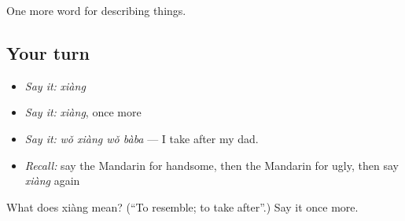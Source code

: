 \begin{grammarlens}[title={What you've built}]
One more word for describing things.
\end{grammarlens}

\subsection*{Your turn}
\begin{itemize}
\raggedright
  \item \emph{Say it:} \emph{xiàng}
  \item \emph{Say it:} \emph{xiàng}, once more
  \item \emph{Say it:} \emph{wǒ xiàng wǒ bàba} — I take after my dad.
  \item \emph{Recall:} say the Mandarin for handsome, then the Mandarin for ugly, then say \emph{xiàng} again
\end{itemize}

\begin{tcolorbox}[breakable,colback=teal!4,colframe=teal!35!black,title={Before you move on}]
What does xiàng mean? (\textquotedblleft{}To resemble; to take after\textquotedblright{}.) Say it once more.
\end{tcolorbox}
